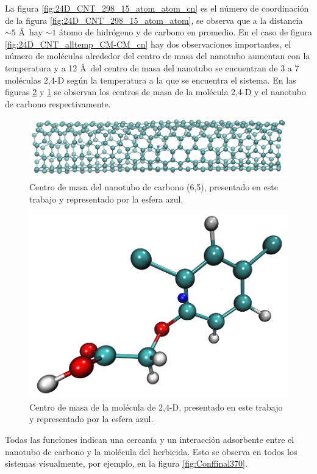 La figura \ref{fig:24D_CNT_298_15_atom_atom_cn} es el número de coordinación de la figura \ref{fig:24D_CNT_298_15_atom_atom}, se observa que a la distancia $\sim 5$ \AA\ hay $\sim 1$ átomo de hidrógeno y de carbono en promedio. En el caso de figura \ref{fig:24D_CNT_alltemp_CM-CM_cn} hay dos observaciones importantes, el número de moléculas alrededor del centro de masa del nanotubo aumentan con la temperatura y a 12 \AA\  del centro de masa del nanotubo se encuentran de 3 a 7 moléculas 2,4-D según la temperatura a la que se encuentra el sistema. En las figuras \ref{fig:24DCOM} y \ref{fig:CNTCOM} se observan los centros de masa de la molécula 2,4-D y el nanotubo de carbono respectivamente.\\

\begin{figure}[!h]
    \centering
    \includegraphics[width=.9\textwidth,keepaspectratio=true]{resultados/CNTCOM.png}
    \caption{Centro de masa del nanotubo de carbono (6,5),  presentado en este trabajo y representado por la esfera azul.}
    \label{fig:CNTCOM}
\end{figure}

\begin{figure}[!h]
    \centering
    \includegraphics[width=.5\textwidth,keepaspectratio=true]{resultados/24DCOM.png}
    \caption{Centro de masa de la molécula de 2,4-D,  presentado en este trabajo y representado por la esfera azul.}
    \label{fig:24DCOM}
\end{figure}

Todas las funciones indican una cercanía y un interacción adsorbente entre el nanotubo de carbono y la molécula del herbicida. Esto se observa en todos los sistemas visualmente, por ejemplo, en la figura \ref{fig:Conffinal370}. 

